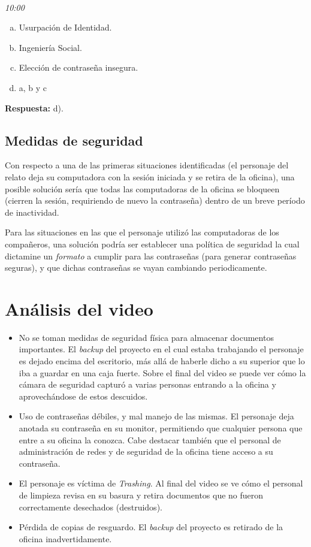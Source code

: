 ~\\
\emph{10:00} 
\begin{enumerate}[a)]
    \item Usurpación de Identidad.
    \item Ingeniería Social.
    \item Elección de contraseña insegura.
    \item a, b y c
\end{enumerate}

\textbf{Respuesta:} d). 

\subsection{Medidas de seguridad}

Con respecto a una de las primeras situaciones identificadas (el personaje del relato deja su computadora con la sesión iniciada y se retira de la oficina), una posible solución sería que todas las computadoras de la oficina se bloqueen (cierren la sesión, requiriendo de nuevo la contraseña) dentro de un breve período de inactividad.

Para las situaciones en las que el personaje utilizó las computadoras de los compañeros, una solución podría ser establecer una política de seguridad la cual dictamine un \emph{formato} a cumplir para las contraseñas (para generar contraseñas seguras), y que dichas contraseñas se vayan cambiando periodicamente. 

\section{Análisis del video }

\begin{itemize}
    \item No se toman medidas de seguridad física para almacenar documentos importantes. El \emph{backup} del proyecto en el cual estaba trabajando el personaje es dejado encima del escritorio, más allá de haberle dicho a su superior que lo iba a guardar en una caja fuerte. Sobre el final del video se puede ver cómo la cámara de seguridad capturó a varias personas entrando a la oficina y aprovechándose de estos descuidos.
    \item Uso de contraseñas débiles, y mal manejo de las mismas. El personaje deja anotada su contraseña en su monitor, permitiendo que cualquier persona que entre a su oficina la conozca. Cabe destacar también que el personal de administración de redes y de seguridad de la oficina tiene acceso a su contraseña.
    \item El personaje es víctima de \emph{Trashing}. Al final del video se ve cómo el personal de limpieza revisa en su basura y retira documentos que no fueron correctamente desechados (destruidos). 
    \item Pérdida de copias de resguardo. El \emph{backup} del proyecto es retirado de la oficina inadvertidamente. 
\end{itemize}


